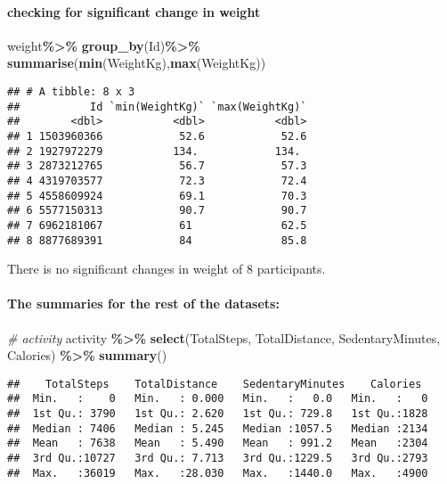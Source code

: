 \documentclass[
]{article}
\newenvironment{Shaded}{\begin{snugshade}}{\end{snugshade}}
\newcommand{\CommentTok}[1]{\textcolor[rgb]{0.56,0.35,0.01}{\textit{#1}}}
\newcommand{\FunctionTok}[1]{\textcolor[rgb]{0.13,0.29,0.53}{\textbf{#1}}}
\newcommand{\NormalTok}[1]{#1}
\newcommand{\SpecialCharTok}[1]{\textcolor[rgb]{0.81,0.36,0.00}{\textbf{#1}}}
\begin{document}
\hypertarget{checking-for-significant-change-in-weight}{%
\paragraph{checking for significant change in
weight}\label{checking-for-significant-change-in-weight}}

\begin{Shaded}
\begin{Highlighting}[]
\NormalTok{weight}\SpecialCharTok{\%\textgreater{}\%}
 \FunctionTok{group\_by}\NormalTok{(Id)}\SpecialCharTok{\%\textgreater{}\%}
  \FunctionTok{summarise}\NormalTok{(}\FunctionTok{min}\NormalTok{(WeightKg),}\FunctionTok{max}\NormalTok{(WeightKg))}
\end{Highlighting}
\end{Shaded}

\begin{verbatim}
## # A tibble: 8 x 3
##           Id `min(WeightKg)` `max(WeightKg)`
##        <dbl>           <dbl>           <dbl>
## 1 1503960366            52.6            52.6
## 2 1927972279           134.            134. 
## 3 2873212765            56.7            57.3
## 4 4319703577            72.3            72.4
## 5 4558609924            69.1            70.3
## 6 5577150313            90.7            90.7
## 7 6962181067            61              62.5
## 8 8877689391            84              85.8
\end{verbatim}

There is no significant changes in weight of 8 participants.

\hypertarget{the-summaries-for-the-rest-of-the-datasets}{%
\paragraph{The summaries for the rest of the
datasets:}\label{the-summaries-for-the-rest-of-the-datasets}}

\begin{Shaded}
\begin{Highlighting}[]
\CommentTok{\# activity}
\NormalTok{activity }\SpecialCharTok{\%\textgreater{}\%}  
  \FunctionTok{select}\NormalTok{(TotalSteps,}
\NormalTok{         TotalDistance,}
\NormalTok{         SedentaryMinutes, Calories) }\SpecialCharTok{\%\textgreater{}\%}
  \FunctionTok{summary}\NormalTok{()}
\end{Highlighting}
\end{Shaded}

\begin{verbatim}
##    TotalSteps    TotalDistance    SedentaryMinutes    Calories   
##  Min.   :    0   Min.   : 0.000   Min.   :   0.0   Min.   :   0  
##  1st Qu.: 3790   1st Qu.: 2.620   1st Qu.: 729.8   1st Qu.:1828  
##  Median : 7406   Median : 5.245   Median :1057.5   Median :2134  
##  Mean   : 7638   Mean   : 5.490   Mean   : 991.2   Mean   :2304  
##  3rd Qu.:10727   3rd Qu.: 7.713   3rd Qu.:1229.5   3rd Qu.:2793  
##  Max.   :36019   Max.   :28.030   Max.   :1440.0   Max.   :4900
\end{verbatim}
\end{document}
